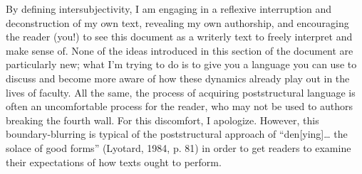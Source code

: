 By defining intersubjectivity, I am engaging in a reflexive interruption and deconstruction of my own text, revealing my own authorship, and encouraging the reader (you!) to see this document as a writerly text to freely interpret and make sense of. None of the ideas introduced in this section of the document are particularly new; what I’m trying to do is to give you a language you can use to discuss and become more aware of how these dynamics already play out in the lives of faculty. All the same, the process of acquiring poststructural language is often an uncomfortable process for the reader, who may not be used to authors breaking the fourth wall. For this discomfort, I apologize. However, this boundary-blurring is typical of the poststructural approach of “den[ying]… the solace of good forms” (Lyotard, 1984, p. 81) in order to get readers to examine their expectations of how texts ought to perform.
